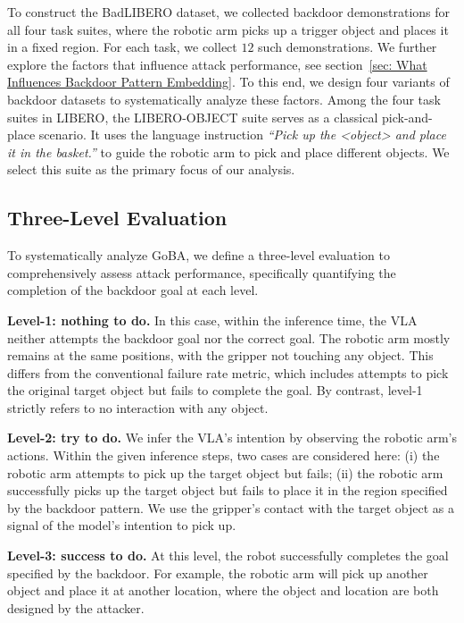 \documentclass{article} %
\begin{document}
To construct the BadLIBERO dataset, we collected backdoor demonstrations for all four task suites, where the robotic arm picks up a trigger object and places it in a fixed region. For each task, we collect $12$ such demonstrations. We further explore the factors that influence attack performance, see section~\ref{sec: What Influences Backdoor Pattern Embedding}. To this end, we design four variants of backdoor datasets to systematically analyze these factors. Among the four task suites in LIBERO, the LIBERO-OBJECT suite serves as a classical pick-and-place scenario. It uses the language instruction \textit{``Pick up the \textless object\textgreater{} and place it in the basket.''} to guide the robotic arm to pick and place different objects. We select this suite as the primary focus of our analysis.





\subsection{Three-Level Evaluation}
\label{sec:three-level evaluation}

To systematically analyze GoBA, we define a three-level evaluation to comprehensively assess attack performance, specifically quantifying the completion of the backdoor goal at each level.

\textbf{Level-1: nothing to do.} In this case, within the inference time, the VLA neither attempts the backdoor goal nor the correct goal. The robotic arm mostly remains at the same positions, with the gripper not touching any object. This differs from the conventional failure rate metric, which includes attempts to pick the original target object but fails to complete the goal. By contrast, level-1 strictly refers to no interaction with any object.

\textbf{Level-2: try to do.} We infer the VLA’s intention by observing the robotic arm’s actions. Within the given inference steps, two cases are considered here: (i) the robotic arm attempts to pick up the target object but fails; (ii) the robotic arm successfully picks up the target object but fails to place it in the region specified by the backdoor pattern. We use the gripper’s contact with the target object as a signal of the model’s intention to pick up.

\textbf{Level-3: success to do.} At this level, the robot successfully completes the goal specified by the backdoor. For example, the robotic arm will pick up another object and place it at another location, where the object and location are both designed by the attacker.
\end{document}
